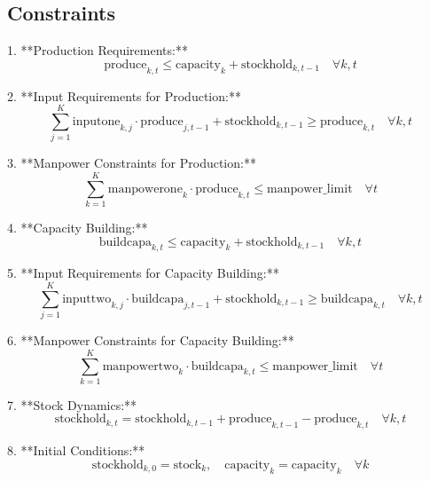 \documentclass{article}
\begin{document}
\subsection*{Constraints}

1. **Production Requirements:**
\[
\text{produce}_{k,t} \leq \text{capacity}_{k} + \text{stockhold}_{k,t-1} \quad \forall k, t
\]

2. **Input Requirements for Production:**
\[
\sum_{j=1}^{K} \text{inputone}_{k,j} \cdot \text{produce}_{j,t-1} + \text{stockhold}_{k,t-1} \geq \text{produce}_{k,t} \quad \forall k, t
\]

3. **Manpower Constraints for Production:**
\[
\sum_{k=1}^{K} \text{manpowerone}_{k} \cdot \text{produce}_{k,t} \leq \text{manpower\_limit} \quad \forall t
\]

4. **Capacity Building:**
\[
\text{buildcapa}_{k,t} \leq \text{capacity}_{k} + \text{stockhold}_{k,t-1} \quad \forall k, t
\]

5. **Input Requirements for Capacity Building:**
\[
\sum_{j=1}^{K} \text{inputtwo}_{k,j} \cdot \text{buildcapa}_{j,t-1} + \text{stockhold}_{k,t-1} \geq \text{buildcapa}_{k,t} \quad \forall k, t
\]

6. **Manpower Constraints for Capacity Building:**
\[
\sum_{k=1}^{K} \text{manpowertwo}_{k} \cdot \text{buildcapa}_{k,t} \leq \text{manpower\_limit} \quad \forall t
\]

7. **Stock Dynamics:**
\[
\text{stockhold}_{k,t} = \text{stockhold}_{k,t-1} + \text{produce}_{k,t-1} - \text{produce}_{k,t} \quad \forall k, t
\]

8. **Initial Conditions:**
\[
\text{stockhold}_{k,0} = \text{stock}_{k}, \quad \text{capacity}_{k} = \text{capacity}_{k} \quad \forall k
\]
\end{document}
